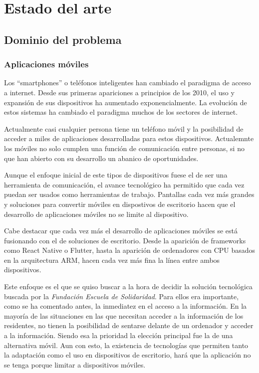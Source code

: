 \chapter{Estado del arte}

     

\section{Dominio del problema}

\subsection{Aplicaciones móviles}

Los ``smartphones'' o teléfonos inteligentes han cambiado el paradigma de acceso a internet. Desde sus primeras apariciones a principios de los 2010, el uso y expansión de sus dispositivos ha aumentado exponencialmente. La evolución de estos sistemas ha cambiado el paradigma muchos de los sectores de internet. 

Actualmente casi cualquier persona tiene un teléfono móvil y la posibilidad de acceder a miles de aplicaciones desarrolladas para estos dispositivos. Actualemnte los móviles no solo cumplen una función de comunicación entre personas, si no que han abierto con su desarrollo un abanico de oportunidades.

Aunque el enfoque inicial de este tipos de dispositivos fuese el de ser una herramienta de comunicación, el avance tecnológico ha permitido que cada vez puedan ser usados como herramientas de trabajo. Pantallas cada vez más grandes y soluciones para convertir móviles en dispostivos de escritorio hacen que el desarrollo de aplicaciones móviles no se limite al dispositivo. 

Cabe destacar que cada vez más el desarrollo de aplicaciones móviles se está fusionando con el de soluciones de escritorio. Desde la aparición de frameworks como React Native o Flutter, hasta la aparición de ordenadores con CPU basados en la arquitectura ARM, hacen cada vez más fina la línea entre ambos dispositivos. 

Este enfoque es el que se quiso buscar a la hora de decidir la solución tecnológica buscada por la \textit{Fundación Escuela de Solidaridad}. Para ellos era importante, como se ha comentado antes, la inmediatez en el acceso a la información. En la mayoría de las situaciones en las que necesitan acceder a la información de los residentes, no tienen la posibilidad de sentarse delante de un ordenador y acceder a la información. Siendo esa la prioridad la elección principal fue la de una alternativa móvil. Aun con esto, la existencia de tecnologías que permiten tanto la adaptación como el uso en dispositivos de escritorio, hará que la aplicación no se tenga porque limitar a dispositivos móviles.

